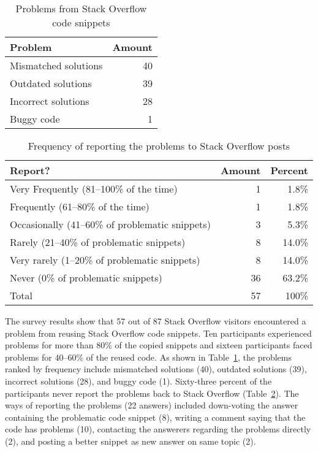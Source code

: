 \documentclass[a4paper,twoside,10pt]{reviewresponse}
\begin{document}
\begin{table}
	\centering
	\caption{Problems from Stack Overflow code snippets}
	\label{tab:visitor_survey_code_problems}
	\begin{tabular}{lr}
		\toprule
		Problem & Amount \\
		\midrule
		Mismatched solutions & 40 \\
		Outdated solutions & 39 \\
		Incorrect solutions	& 28 \\
		Buggy code & 1 \\
		\bottomrule
	\end{tabular}
\end{table}

\begin{table}
	\centering
	\caption{Frequency of reporting the problems to Stack Overflow posts}
	\label{tab:visitor_survey_report_problem}
	\begin{tabular}{lrr}
		\toprule
		Report? & Amount & Percent \\
		\midrule
		Very Frequently (81--100\% of the time)	& 1 & 1.8\% \\
		Frequently (61--80\% of the time) & 1 & 1.8\% \\
		Occasionally (41--60\% of problematic snippets) & 3 & 5.3\% \\
		Rarely (21--40\% of problematic snippets) & 8 & 14.0\% \\
		Very rarely (1--20\% of problematic snippets) & 8 & 14.0\% \\
		Never (0\% of problematic snippets) & 36 & 63.2\% \\
		\midrule
		Total & 57 & 100\% \\
		\bottomrule
	\end{tabular}
\end{table}

The survey results show that 57 out of 87 Stack Overflow visitors encountered a
problem from reusing Stack Overflow code snippets. Ten participants experienced
problems for more than 80\% of the copied snippets and sixteen participants
faced problems for 40--60\% of the reused code. As shown in Table~\ref{tab:visitor_survey_code_problems}, 
the problems ranked by frequency
include mismatched solutions (40), outdated solutions (39), incorrect solutions
(28), and buggy code (1). Sixty-three percent of the participants never report
the problems back to Stack Overflow (Table~\ref{tab:visitor_survey_report_problem}). 
The ways of reporting the problems
(22 answers) included down-voting the answer containing the problematic code
snippet (8), writing a comment saying that the code has problems (10),
contacting the answerers regarding the problems directly (2), and posting a
better snippet as new answer on same topic (2).
\end{document}
